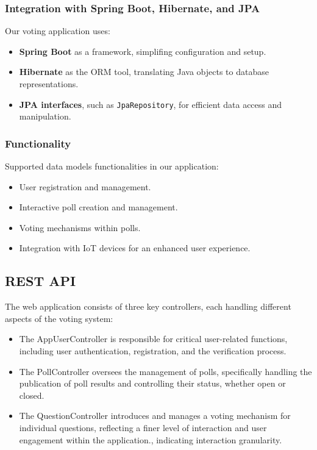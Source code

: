\subsubsection{Integration with Spring Boot, Hibernate, and JPA}
Our voting application uses:

\begin{itemize}
    \item \textbf{Spring Boot} as a framework, simplifing configuration and setup.
    \item \textbf{Hibernate} as the ORM tool, translating Java objects to database representations.
    \item \textbf{JPA interfaces}, such as \texttt{JpaRepository}, for efficient data access and manipulation.
\end{itemize}

\subsubsection{Functionality}

Supported data models functionalities in our application:
\begin{itemize}
    \item User registration and management.
    \item Interactive poll creation and management.
    \item Voting mechanisms within polls.
    \item Integration with IoT devices for an enhanced user experience.
\end{itemize}

\subsection{REST API}
The web application consists of three key controllers, each handling different aspects of the voting system:

\begin{itemize}
    \item The AppUserController is responsible for critical user-related functions, including user authentication, registration, and the verification process.
    \item The PollController oversees the management of polls, specifically handling the publication of poll results and controlling their status, whether open or closed.
    \item The QuestionController introduces and manages a voting mechanism for individual questions, reflecting a finer level of interaction and user engagement within the application., indicating interaction granularity.
\end{itemize}

